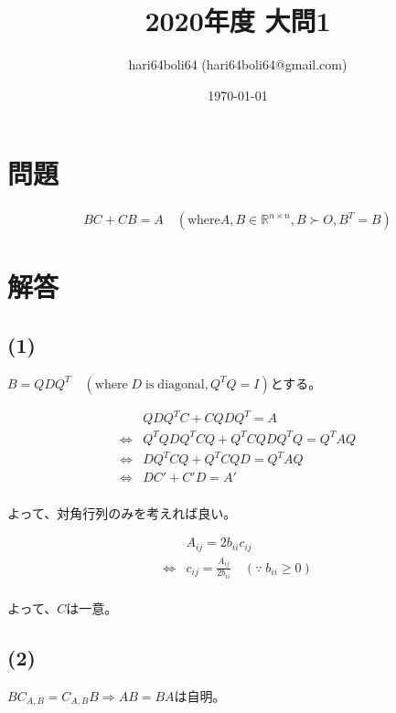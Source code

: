 \documentclass[a4paper, 10pt, dvipdfmx]{jlreq}
\begin{document}
\title{2020年度 大問1}
\author{hari64boli64 (hari64boli64@gmail.com)}
\date{\today}
\maketitle


\section{問題}

\begin{align*}
    BC+CB=A \quad (\mathrm{where} A,B \in \mathbb{R}^{n\times n}, B\succ O, B^T=B)
\end{align*}

\section{解答}

\subsection*{(1)}

$B=QDQ^T \quad (\mathrm{where} \; D \; \mathrm{is}\; \mathrm{diagonal}, Q^TQ=I)$とする。

\begin{align*}
                    & QDQ^TC+CQDQ^T=A             \\
    \Leftrightarrow & Q^TQDQ^TCQ+Q^TCQDQ^TQ=Q^TAQ \\
    \Leftrightarrow & DQ^TCQ+Q^TCQD=Q^TAQ         \\
    \Leftrightarrow & DC'+C'D=A'                  \\
\end{align*}

よって、対角行列のみを考えれば良い。

\begin{align*}
                    & A_{ij}=2b_{ii}c_{ij}                                           \\
    \Leftrightarrow & c_{ij}=\frac{A_{ij}}{2b_{ii}}\quad (\because \; b_{ii} \geq 0) \\
\end{align*}

よって、$C$は一意。

\subsection*{(2)}

$BC_{A,B}=C_{A,B}B \Rightarrow AB=BA$は自明。
\end{document}
